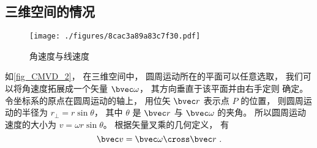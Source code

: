 \subsection{三维空间的情况}\label{sub_CMVD_1}

\begin{figure}[ht]
\centering
\texttt{[image: ./figures/8cac3a89a83c7f30.pdf]}
\caption{角速度与线速度} \label{fig_CMVD_2}
\end{figure}

如\autoref{fig_CMVD_2}， 在三维空间中， 圆周运动所在的平面可以任意选取， 我们可以将角速度拓展成一个矢量 $\bvec\omega$， 其方向垂直于该平面并由右手定则 确定。 令坐标系的原点在圆周运动的轴上， 用位矢 $\bvec r$ 表示点 $P$ 的位置， 则圆周运动的半径为 $r_\bot = r \sin\theta$， 其中 $\theta$ 是 $\bvec r$ 与 $\bvec \omega$ 的夹角。 所以圆周运动速度的大小为 $v = \omega r \sin\theta$。 根据矢量叉乘的几何定义， 有
\begin{equation}\label{eq_CMVD_5}
\bvec v = \bvec\omega \cross \bvec r~.
\end{equation}
